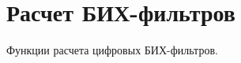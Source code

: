 \hypertarget{group___i_i_r___f_i_l_t_e_r___d_e_s_i_g_n___g_r_o_u_p}{}\section{Расчет БИХ-\/фильтров}
\label{group___i_i_r___f_i_l_t_e_r___d_e_s_i_g_n___g_r_o_u_p}
Функции расчета цифровых БИХ-\/фильтров. 